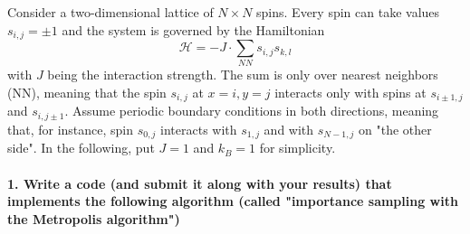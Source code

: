 
Consider a two-dimensional lattice of $N\times N$ spins. 
Every spin can take values $s_{i,j}=\pm1$ and the system 
is governed by the Hamiltonian
\begin{equation}
    \mathcal{H}=-J\cdot\sum_{NN}s_{i,j}s_{k,l}
\end{equation}
with $J$ being the interaction strength. The sum is only 
over nearest neighbors (NN), meaning that the spin 
$s_{i,j}$ at $x=i,y=j$ interacts only with spins at 
$s_{i\pm1,j}$ and $s_{i,j\pm1}$. Assume periodic boundary
conditions in both directions, meaning that, for instance, 
spin $s_{0,j}$ interacts with $s_{1,j}$ and with 
$s_{N-1,j}$ on "the other side". In the following, put 
$J=1$ and $k_B=1$ for simplicity.

\paragraph{1. Write a code (and submit it along with your 
    results) that implements the following algorithm
    (called "importance sampling with the Metropolis 
    algorithm")
} \ \\

